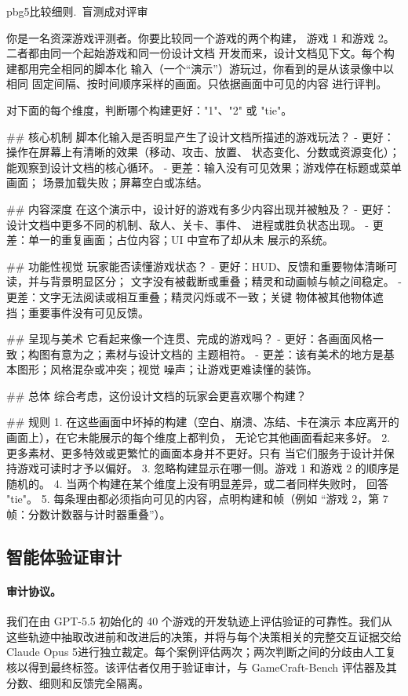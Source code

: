 \begin{promptbox}{pbg5}{比较细则.\ 盲测成对评审}
\begin{PV}
你是一名资深游戏评测者。你要比较同一个游戏的两个构建，
游戏 1 和游戏 2。二者都由同一个起始游戏和同一份设计文档
开发而来，设计文档见下文。每个构建都用完全相同的脚本化
输入（一个“演示”）游玩过，你看到的是从该录像中以相同
固定间隔、按时间顺序采样的画面。只依据画面中可见的内容
进行评判。

对下面的每个维度，判断哪个构建更好："1"、"2" 或 "tie"。

## 核心机制
脚本化输入是否明显产生了设计文档所描述的游戏玩法？
- 更好：操作在屏幕上有清晰的效果（移动、攻击、放置、
  状态变化、分数或资源变化）；能观察到设计文档的核心循环。
- 更差：输入没有可见效果；游戏停在标题或菜单画面；
  场景加载失败；屏幕空白或冻结。

## 内容深度
在这个演示中，设计好的游戏有多少内容出现并被触及？
- 更好：设计文档中更多不同的机制、敌人、关卡、事件、
  进程或胜负状态出现。
- 更差：单一的重复画面；占位内容；UI 中宣布了却从未
  展示的系统。

## 功能性视觉
玩家能否读懂游戏状态？
- 更好：HUD、反馈和重要物体清晰可读，并与背景明显区分；
  文字没有被截断或重叠；精灵和动画帧与帧之间稳定。
- 更差：文字无法阅读或相互重叠；精灵闪烁或不一致；关键
  物体被其他物体遮挡；重要事件没有可见反馈。

## 呈现与美术
它看起来像一个连贯、完成的游戏吗？
- 更好：各画面风格一致；构图有意为之；素材与设计文档的
  主题相符。
- 更差：该有美术的地方是基本图形；风格混杂或冲突；视觉
  噪声；让游戏更难读懂的装饰。

## 总体
综合考虑，这份设计文档的玩家会更喜欢哪个构建？

## 规则
1. 在这些画面中坏掉的构建（空白、崩溃、冻结、卡在演示
   本应离开的画面上），在它未能展示的每个维度上都判负，
   无论它其他画面看起来多好。
2. 更多素材、更多特效或更繁忙的画面本身并不更好。只有
   当它们服务于设计并保持游戏可读时才予以偏好。
3. 忽略构建显示在哪一侧。游戏 1 和游戏 2 的顺序是随机的。
4. 当两个构建在某个维度上没有明显差异，或二者同样失败时，
   回答 "tie"。
5. 每条理由都必须指向可见的内容，点明构建和帧（例如
   “游戏 2，第 7 帧：分数计数器与计时器重叠”）。
\end{PV}
\end{promptbox}

\subsection{智能体验证审计}\label{app:audit}
\paragraph{审计协议。}我们在由 GPT-5.5 初始化的 40 个游戏的开发轨迹上评估验证的可靠性。我们从这些轨迹中抽取改进前和改进后的决策，并将与每个决策相关的完整交互证据交给 Claude Opus 5\citep{anthropic2026}进行独立裁定。每个案例评估两次；两次判断之间的分歧由人工复核以得到最终标签。该评估者仅用于验证审计，与 GameCraft-Bench 评估器及其分数、细则和反馈完全隔离。

